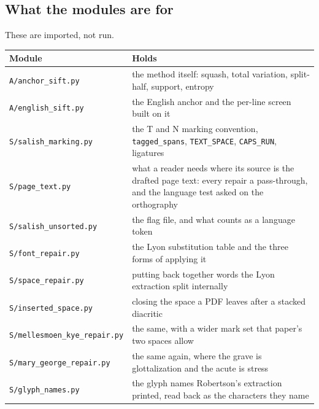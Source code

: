 \subsection{What the modules are for}

These are imported, not run.

\tiny
\setlength{\tabcolsep}{2pt}
\begin{longtable}{@{}>{\raggedright\arraybackslash}p{}>{\raggedright\arraybackslash}p{}@{}}
\toprule
Module & Holds \\
\midrule
\texttt{A/\allowbreak{}anchor\_\allowbreak{}sift.\allowbreak{}py} & the method itself: squash, total variation, split-half, support, entropy \\
\texttt{A/\allowbreak{}english\_\allowbreak{}sift.\allowbreak{}py} & the English anchor and the per-line screen built on it \\
\texttt{S/\allowbreak{}salish\_\allowbreak{}marking.\allowbreak{}py} & the T and N marking convention, \texttt{tagged\_\allowbreak{}spans}, \texttt{TEXT\_\allowbreak{}SPACE}, \texttt{CAPS\_\allowbreak{}RUN}, ligatures \\
\texttt{S/\allowbreak{}page\_\allowbreak{}text.\allowbreak{}py} & what a reader needs where its source is the drafted page text: every repair a pass-through, and the language test asked on the orthography \\
\texttt{S/\allowbreak{}salish\_\allowbreak{}unsorted.\allowbreak{}py} & the flag file, and what counts as a language token \\
\texttt{S/\allowbreak{}font\_\allowbreak{}repair.\allowbreak{}py} & the Lyon substitution table and the three forms of applying it \\
\texttt{S/\allowbreak{}space\_\allowbreak{}repair.\allowbreak{}py} & putting back together words the Lyon extraction split internally \\
\texttt{S/\allowbreak{}inserted\_\allowbreak{}space.\allowbreak{}py} & closing the space a PDF leaves after a stacked diacritic \\
\texttt{S/\allowbreak{}mellesmoen\_\allowbreak{}kye\_\allowbreak{}repair.\allowbreak{}py} & the same, with a wider mark set that paper's two spaces allow \\
\texttt{S/\allowbreak{}mary\_\allowbreak{}george\_\allowbreak{}repair.\allowbreak{}py} & the same again, where the grave is glottalization and the acute is stress \\
\texttt{S/\allowbreak{}glyph\_\allowbreak{}names.\allowbreak{}py} & the glyph names Robertson's extraction printed, read back as the characters they name \\

\end{longtable}
